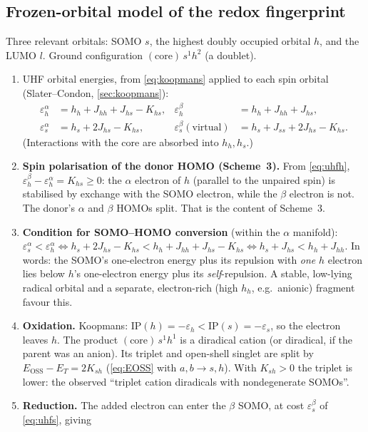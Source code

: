 \subsection{Frozen-orbital model of the redox fingerprint}
Three relevant orbitals: SOMO $s$, the highest doubly occupied orbital $h$, and the LUMO $l$. Ground
configuration $(\text{core})\,s^1h^2$ (a doublet).
\begin{enumerate}
  \item UHF orbital energies, from \cref{eq:koopmans} applied to each spin orbital (Slater--Condon, \cref{sec:koopmans}):
        \begin{align}
          \varepsilon_h^\alpha&=h_h+J_{hh}+J_{hs}-K_{hs}, &\varepsilon_h^\beta&=h_h+J_{hh}+J_{hs},\label{eq:uhfh}\\
          \varepsilon_s^\alpha&=h_s+2J_{hs}-K_{hs}, &\varepsilon_s^\beta(\text{virtual})&=h_s+J_{ss}+2J_{hs}-K_{hs}.\label{eq:uhfs}
        \end{align}
        (Interactions with the core are absorbed into $h_h,h_s$.)
  \item \textbf{Spin polarisation of the donor HOMO (Scheme~3).} From \cref{eq:uhfh},
        $\varepsilon_h^\beta-\varepsilon_h^\alpha=K_{hs}\ge0$: the $\alpha$ electron of $h$ (parallel to the unpaired spin) is
        stabilised by exchange with the SOMO electron, while the $\beta$ electron is not. The donor's $\alpha$ and
        $\beta$ HOMOs split. That is the content of Scheme~3.
  \item \textbf{Condition for SOMO--HOMO conversion} (within the $\alpha$ manifold):
        $\varepsilon_s^\alpha<\varepsilon_h^\alpha\iff h_s+2J_{hs}-K_{hs}<h_h+J_{hh}+J_{hs}-K_{hs}\iff h_s+J_{hs}<h_h+J_{hh}$.
        In words: the SOMO's one-electron energy plus its repulsion with \emph{one} $h$ electron lies below
        $h$'s one-electron energy plus its \emph{self}-repulsion. A stable, low-lying radical orbital and a
        separate, electron-rich (high $h_h$, e.g.\ anionic) fragment favour this.
  \item \textbf{Oxidation.} Koopmans: $\mathrm{IP}(h)=-\varepsilon_h<\mathrm{IP}(s)=-\varepsilon_s$, so the electron leaves $h$.
        The product $(\text{core})\,s^1h^1$ is a diradical cation (or diradical, if the parent was an anion). Its
        triplet and open-shell singlet are split by $E_{\text{OSS}}-E_T=2K_{sh}$ (\cref{eq:EOSS} with $a,b\to s,h$).
        With $K_{sh}>0$ the triplet is lower: the observed ``triplet cation diradicals with nondegenerate SOMOs''.
  \item \textbf{Reduction.} The added electron can enter the $\beta$ SOMO, at cost $\varepsilon_s^\beta$ of \cref{eq:uhfs}, giving

\end{enumerate}
